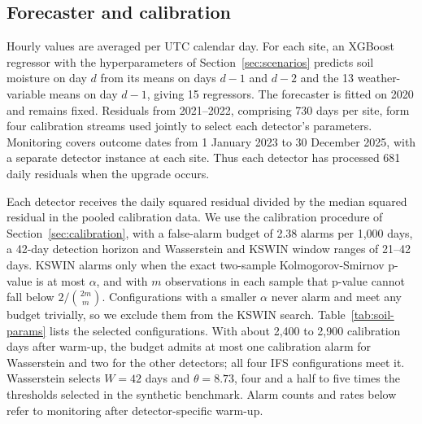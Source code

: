 \documentclass[preprint,12pt]{elsarticle}
\begin{document}
\subsection{Forecaster and calibration}
\label{sec:soil-protocol}
Hourly values are averaged per UTC calendar day. For each site, an XGBoost regressor with the hyperparameters of Section~\ref{sec:scenarios} predicts soil moisture on day $d$ from its means on days $d-1$ and $d-2$ and the 13 weather-variable means on day $d-1$, giving 15 regressors. The forecaster is fitted on 2020 and remains fixed. Residuals from 2021--2022, comprising 730 days per site, form four calibration streams used jointly to select each detector's parameters. Monitoring covers outcome dates from 1 January 2023 to 30 December 2025, with a separate detector instance at each site. Thus each detector has processed 681 daily residuals when the upgrade occurs.

Each detector receives the daily squared residual divided by the median squared residual in the pooled calibration data. We use the calibration procedure of Section~\ref{sec:calibration}, with a false-alarm budget of 2.38 alarms per 1,000 days, a 42-day detection horizon and Wasserstein and KSWIN window ranges of 21--42 days. KSWIN alarms only when the exact two-sample Kolmogorov-Smirnov p-value is at most $\alpha$, and with $m$ observations in each sample that p-value cannot fall below $2/\binom{2m}{m}$. Configurations with a smaller $\alpha$ never alarm and meet any budget trivially, so we exclude them from the KSWIN search. Table~\ref{tab:soil-params} lists the selected configurations. With about 2,400 to 2,900 calibration days after warm-up, the budget admits at most one calibration alarm for Wasserstein and two for the other detectors; all four IFS configurations meet it. Wasserstein selects $W=42$ days and $\theta=8.73$, four and a half to five times the thresholds selected in the synthetic benchmark. Alarm counts and rates below refer to monitoring after detector-specific warm-up.
\end{document}
